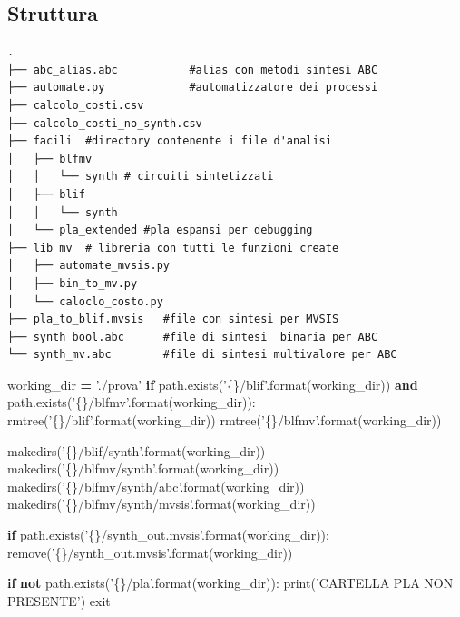 \documentclass[italian,]{book}
\newenvironment{Shaded}{\begin{snugshade}}{\end{snugshade}}
\newcommand{\BuiltInTok}[1]{#1}
\newcommand{\ControlFlowTok}[1]{\textcolor[rgb]{0.13,0.29,0.53}{\textbf{#1}}}
\newcommand{\KeywordTok}[1]{\textcolor[rgb]{0.13,0.29,0.53}{\textbf{#1}}}
\newcommand{\NormalTok}[1]{#1}
\newcommand{\OperatorTok}[1]{\textcolor[rgb]{0.81,0.36,0.00}{\textbf{#1}}}
\newcommand{\SpecialCharTok}[1]{\textcolor[rgb]{0.00,0.00,0.00}{#1}}
\newcommand{\StringTok}[1]{\textcolor[rgb]{0.31,0.60,0.02}{#1}}
\begin{document}
\hypertarget{struttura}{%
\subsection{Struttura}\label{struttura}}

\begin{verbatim}
.
├── abc_alias.abc           #alias con metodi sintesi ABC
├── automate.py             #automatizzatore dei processi
├── calcolo_costi.csv
├── calcolo_costi_no_synth.csv
├── facili  #directory contenente i file d'analisi
│   ├── blfmv
│   │   └── synth # circuiti sintetizzati
│   ├── blif
│   │   └── synth
│   └── pla_extended #pla espansi per debugging
├── lib_mv  # libreria con tutti le funzioni create
│   ├── automate_mvsis.py
│   ├── bin_to_mv.py
│   └── caloclo_costo.py
├── pla_to_blif.mvsis   #file con sintesi per MVSIS
├── synth_bool.abc      #file di sintesi  binaria per ABC
└── synth_mv.abc        #file di sintesi multivalore per ABC
\end{verbatim}

\newpage

\begin{Shaded}
\begin{Highlighting}[]
\NormalTok{working_dir }\OperatorTok{=} \StringTok{'./prova'}
 \ControlFlowTok{if}\NormalTok{ path.exists(}\StringTok{'}\SpecialCharTok{\{\}}\StringTok{/blif'}\NormalTok{.}\BuiltInTok{format}\NormalTok{(working_dir)) }
    \KeywordTok{and}\NormalTok{ path.exists(}\StringTok{'}\SpecialCharTok{\{\}}\StringTok{/blfmv'}\NormalTok{.}\BuiltInTok{format}\NormalTok{(working_dir)):}
\NormalTok{        rmtree(}\StringTok{'}\SpecialCharTok{\{\}}\StringTok{/blif'}\NormalTok{.}\BuiltInTok{format}\NormalTok{(working_dir))}
\NormalTok{        rmtree(}\StringTok{'}\SpecialCharTok{\{\}}\StringTok{/blfmv'}\NormalTok{.}\BuiltInTok{format}\NormalTok{(working_dir))}
      
\NormalTok{makedirs(}\StringTok{'}\SpecialCharTok{\{\}}\StringTok{/blif/synth'}\NormalTok{.}\BuiltInTok{format}\NormalTok{(working_dir))}
\NormalTok{makedirs(}\StringTok{'}\SpecialCharTok{\{\}}\StringTok{/blfmv/synth'}\NormalTok{.}\BuiltInTok{format}\NormalTok{(working_dir))}
\NormalTok{makedirs(}\StringTok{'}\SpecialCharTok{\{\}}\StringTok{/blfmv/synth/abc'}\NormalTok{.}\BuiltInTok{format}\NormalTok{(working_dir))}
\NormalTok{makedirs(}\StringTok{'}\SpecialCharTok{\{\}}\StringTok{/blfmv/synth/mvsis'}\NormalTok{.}\BuiltInTok{format}\NormalTok{(working_dir))}

\ControlFlowTok{if}\NormalTok{ path.exists(}\StringTok{'}\SpecialCharTok{\{\}}\StringTok{/synth_out.mvsis'}\NormalTok{.}\BuiltInTok{format}\NormalTok{(working_dir)):}
\NormalTok{    remove(}\StringTok{'}\SpecialCharTok{\{\}}\StringTok{/synth_out.mvsis'}\NormalTok{.}\BuiltInTok{format}\NormalTok{(working_dir))}

\ControlFlowTok{if} \KeywordTok{not}\NormalTok{ path.exists(}\StringTok{'}\SpecialCharTok{\{\}}\StringTok{/pla'}\NormalTok{.}\BuiltInTok{format}\NormalTok{(working_dir)):}
    \BuiltInTok{print}\NormalTok{(}\StringTok{'CARTELLA PLA NON PRESENTE'}\NormalTok{)}
\NormalTok{    exit}
\end{Highlighting}
\end{Shaded}
\end{document}
